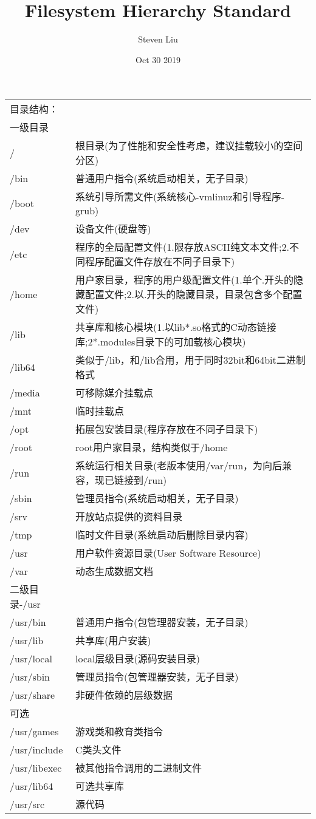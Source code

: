 \documentclass[UTF8, fontset=ubuntu]{ctexart}
\title{Filesystem Hierarchy Standard}
\author{Steven Liu}
\date{Oct 30 2019}
\begin{document}
\maketitle
\vspace{40em}
\begin{longtable}{l l}
目录结构：\\
一级目录 \\
/&根目录(为了性能和安全性考虑，建议挂载较小的空间分区) \\
/bin  &  普通用户指令(系统启动相关，无子目录) \\
/boot  &  系统引导所需文件(系统核心-vmlinuz和引导程序-grub) \\
/dev   & 设备文件(硬盘等) \\
/etc   & 程序的全局配置文件(1.限存放ASCII纯文本文件;2.不同程序配置文件存放在不同子目录下) \\
/home   &  用户家目录，程序的用户级配置文件(1.单个.开头的隐藏配置文件;2.以.开头的隐藏目录，目录包含多个配置文件) \\
/lib   & 共享库和核心模块(1.以lib*.so格式的C动态链接库;2*.modules目录下的可加载核心模块) \\
/lib64  &  类似于/lib，和/lib合用，用于同时32bit和64bit二进制格式 \\
/media   & 可移除媒介挂载点 \\
/mnt   & 临时挂载点 \\
/opt  &  拓展包安装目录(程序存放在不同子目录下) \\
/root  &  root用户家目录，结构类似于/home \\
/run   & 系统运行相关目录(老版本使用/var/run，为向后兼容，现已链接到/run) \\
/sbin   & 管理员指令(系统启动相关，无子目录) \\
/srv   & 开放站点提供的资料目录 \\
/tmp   & 临时文件目录(系统启动后删除目录内容) \\
/usr   & 用户软件资源目录(User Software Resource) \\
/var   & 动态生成数据文档 \vspace{2em} \\

二级目录-/usr \\
/usr/bin   & 普通用户指令(包管理器安装，无子目录) \\
/usr/lib   & 共享库(用户安装) \\
/usr/local  &  local层级目录(源码安装目录) \\
/usr/sbin   & 管理员指令(包管理器安装，无子目录) \\
/usr/share   & 非硬件依赖的层级数据 \\
可选 \\
/usr/games   & 游戏类和教育类指令 \\
/usr/include  &  C类头文件 \\
/usr/libexec   & 被其他指令调用的二进制文件 \\
/usr/lib64   & 可选共享库 \\
/usr/src   & 源代码 \vspace{2em} \\


\end{longtable}
\end{document}
